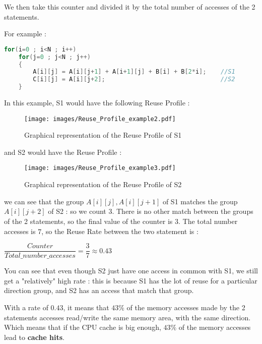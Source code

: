 \documentclass[paper=a4, fontsize=11.5pt]{scrartcl}
\numberwithin{equation}{section}        %
\numberwithin{figure}{section}          %
\numberwithin{table}{section}               %
\begin{document}
            We then take this counter and divided it by the total number of accesses of
            the 2 statements.

            For example :
\begin{lstlisting}[frame=single, language=C, caption={Reuse Profile Rating Example}, label={lst:rp_example}]
for(i=0 ; i<N ; i++)
    for(j=0 ; j<N ; j++)
    {
        A[i][j] = A[i][j+1] + A[i+1][j] + B[i] + B[2*i];    //S1
        C[i][j] = A[i][j+2];                                //S2
    }
\end{lstlisting}
        In this example, S1 would have the following Reuse Profile :
\begin{figure}[H]
    \center
    \texttt{[image: images/Reuse\_Profile\_example2.pdf]}
    \caption{Graphical representation of the Reuse Profile of S1}
\end{figure}
            and S2 would have the Reuse Profile :
\begin{figure}[H]
    \center
    \texttt{[image: images/Reuse\_Profile\_example3.pdf]}
    \caption{Graphical representation of the Reuse Profile of S2}
\end{figure}
        we can see that the group ${A[i][j],A[i][j+1]}$ of S1 matches the group ${A[i][j+2]}$
        of S2 : so we count $3$. There is no other match between the groups of the 2 statements,
        so the final value of the counter is $3$. The total number accesses is $7$, so the
        Reuse Rate between the two statement is :
        \begin{center}
            $\dfrac{\mathit{Counter}}{\mathit{Total\_number\_accesses}} = \dfrac{3}{7} \approx 0.43$
        \end{center}

        \bigskip

        You can see that even though S2 just have one access in common with S1, we still get
        a "relatively" high rate : this is because S1 has the lot of reuse for a particular
        direction group, and S2 has an access that match that group.

        With a rate of $0.43$, it means that $43\%$ of the memory accesses made by the 2 statements accesses
        read/write the same memory area, with the same direction. Which means that if the
        CPU cache is big enough, $43\%$ of the memory accesses lead to \textbf{cache hits}.
            
\end{document}
